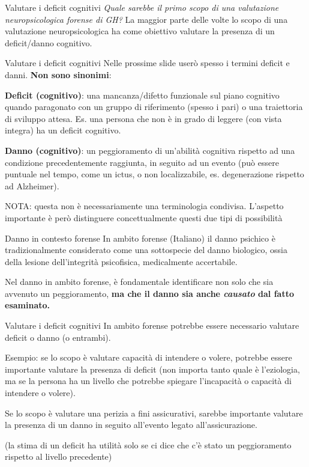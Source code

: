 \documentclass[
  ignorenonframetext,
]{beamer}
\begin{document}
\begin{frame}{Valutare i deficit cognitivi}
\label{valutare-i-deficit-cognitivi}
\emph{Quale sarebbe il primo scopo di una valutazione neuropsicologica
forense di GH?} \pause \vfill La maggior parte delle volte lo scopo di
una valutazione neuropsicologica ha come obiettivo valutare la presenza
di un deficit/danno cognitivo.
\end{frame}

\begin{frame}{Valutare i deficit cognitivi}
\label{valutare-i-deficit-cognitivi-1}
Nelle prossime slide userò spesso i termini deficit e danni. \textbf{Non
sono sinonimi}:

\textbf{Deficit (cognitivo)}: una mancanza/difetto funzionale sul piano
cognitivo quando paragonato con un gruppo di riferimento (spesso i pari)
o una traiettoria di sviluppo attesa. Es. una persona che non è in grado
di leggere (con vista integra) ha un deficit cognitivo.

\pause

\textbf{Danno (cognitivo)}: un peggioramento di un'abilità cognitiva
rispetto ad una condizione precedentemente raggiunta, in seguito ad un
evento (può essere puntuale nel tempo, come un ictus, o non
localizzabile, es. degenerazione rispetto ad Alzheimer). \vspace{2em}

\footnotesize

NOTA: questa non è necessariamente una terminologia condivisa. L'aspetto
importante è però distinguere concettualmente questi due tipi di
possibilità
\end{frame}

\begin{frame}{Danno in contesto forense}
\label{danno-in-contesto-forense}
In ambito forense (Italiano) il danno psichico è tradizionalmente
considerato come una sottospecie del danno biologico, ossia della
lesione dell'integrità psicofisica, medicalmente accertabile.

Nel danno in ambito forense, è fondamentale identificare non solo che
sia avvenuto un peggioramento, \textbf{ma che il danno sia anche
\emph{causato} dal fatto esaminato.}
\end{frame}

\begin{frame}{Valutare i deficit cognitivi}
\label{valutare-i-deficit-cognitivi-2}
In ambito forense potrebbe essere necessario valutare deficit o danno (o
entrambi).

Esempio: se lo scopo è valutare capacità di intendere o volere, potrebbe
essere importante valutare la presenza di deficit (non importa tanto
quale è l'eziologia, ma se la persona ha un livello che potrebbe
spiegare l'incapacità o capacità di intendere o volere).

Se lo scopo è valutare una perizia a fini assicurativi, sarebbe
importante valutare la presenza di un danno in seguito all'evento legato
all'assicurazione.

(la stima di un deficit ha utilità solo se ci dice che c'è stato un
peggioramento rispetto al livello precedente)
\end{frame}
\end{document}
